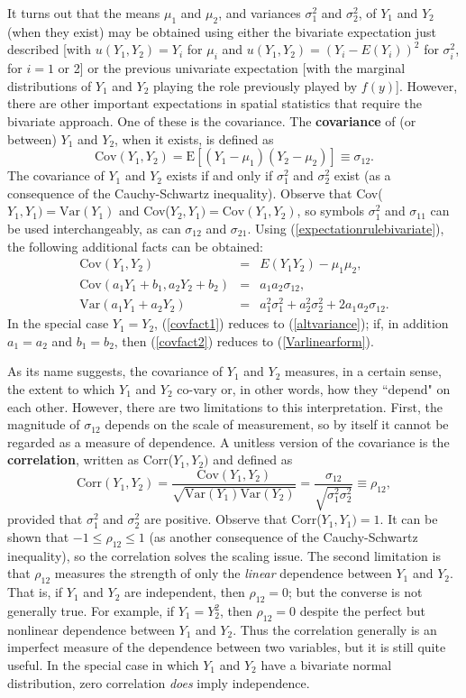 It turns out that the means $\mu_1$ and $\mu_2$, and variances $\sigma_1^2$ and $\sigma_2^2$, of $Y_1$ and $Y_2$ (when they exist) may be obtained using either the bivariate expectation just described [with $u(Y_1,Y_2)=Y_i$ for $\mu_i$ and $u(Y_1,Y_2)=(Y_i-E(Y_i))^2$ for $\sigma_i^2$, for $i=1$ or 2] or the previous univariate expectation [with the marginal distributions of $Y_1$ and $Y_2$ playing the role previously played by $f(y)$].  However, there are other important expectations in spatial statistics that require the bivariate approach.  One of these is the covariance.  The {\bf covariance} of (or between) $Y_1$ and $Y_2$, when it exists, is defined as
\[ \mbox{Cov}(Y_1,Y_2)=\mbox{E}[(Y_1-\mu_1)(Y_2-\mu_2)]\equiv\sigma_{12}. \]
The covariance of $Y_1$ and $Y_2$ exists if and only if $\sigma_1^2$ and $\sigma_2^2$ exist (as a consequence of the Cauchy-Schwartz inequality).  Observe that Cov($Y_1,Y_1)=\mbox{Var}(Y_1)$ and Cov($Y_2,Y_1)=\mbox{Cov}(Y_1,Y_2)$, so symbols $\sigma_1^2$ and $\sigma_{11}$ can be used interchangeably, as can $\sigma_{12}$ and $\sigma_{21}$.  Using (\ref{expectationrulebivariate}), the following additional facts can be obtained:
\begin{eqnarray}
\mbox{Cov}(Y_1,Y_2) & = & E(Y_1Y_2)-\mu_1\mu_2, \label{covfact1} \\
\mbox{Cov}(a_1Y_1+b_1,a_2Y_2+b_2) & = & a_1a_2\sigma_{12}, \label{covfact2} \\
\mbox{Var}(a_1Y_1+a_2Y_2) & = & a_1^2\sigma_1^2+a_2^2\sigma_2^2+2a_1a_2\sigma_{12}. \label{covfact3}
\end{eqnarray}
In the special case $Y_1=Y_2$, (\ref{covfact1}) reduces to (\ref{altvariance}); if, in addition $a_1=a_2$ and $b_1=b_2$, then (\ref{covfact2}) reduces to (\ref{Varlinearform}).

As its name suggests, the covariance of $Y_1$ and $Y_2$ measures, in a certain sense, the extent to which $Y_1$ and $Y_2$ co-vary or, in other words, how they ``depend" on each other.  However, there are two limitations to this interpretation.  First, the magnitude of $\sigma_{12}$ depends on the scale of measurement, so by itself it cannot be regarded as a measure of dependence.  A unitless version of the covariance is the {\bf correlation}, written as Corr($Y_1,Y_2)$ and defined as
\[ \mbox{Corr}(Y_1,Y_2)=\frac{\mbox{Cov}(Y_1,Y_2)}{\sqrt{\mbox{Var}(Y_1)\mbox{Var}(Y_2)}}=\frac{\sigma_{12}}{\sqrt{\sigma_1^2\sigma_2^2}}\equiv\rho_{12}, \]
provided that $\sigma_1^2$ and $\sigma_2^2$ are positive.  Observe that Corr($Y_1,Y_1)=1$.  It can be shown that $-1\leq\rho_{12}\leq 1$ (as another consequence of the Cauchy-Schwartz inequality), so the correlation solves the scaling issue.  The second limitation is that $\rho_{12}$ measures the strength of only the {\em linear} dependence between $Y_1$ and $Y_2$.  That is, if $Y_1$ and $Y_2$ are independent, then $\rho_{12}=0$; but the converse is not generally true.  For example, if $Y_1=Y_2^2$, then $\rho_{12}=0$ despite the perfect but nonlinear dependence between $Y_1$ and $Y_2$.  Thus the correlation generally is an imperfect measure of the dependence between two variables, but it is still quite useful.  In the special case in which $Y_1$ and $Y_2$ have a bivariate normal distribution, zero correlation {\em does} imply independence.

